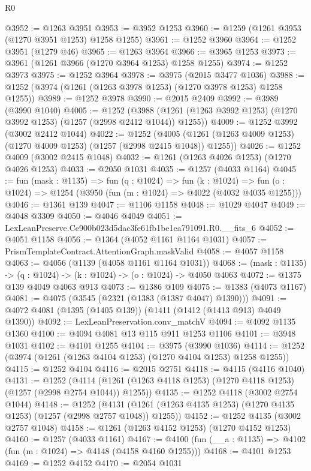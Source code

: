 \begin{lexlean}{R0}
\begin{coremodule}
@3952 := @1263 @3951
@3953 := @3952 @1253
@3960 := @1259 (@1261 @3953 (@1270 @3951 @1253) @1258 @1255)
@3961 := @1252 @3960
@3964 := @1252 @3951 (@1279 @46)
@3965 := @1263 @3964
@3966 := @3965 @1253
@3973 := @3961 (@1261 @3966 (@1270 @3964 @1253) @1258 @1255)
@3974 := @1252 @3973
@3975 := @1252 @3964
@3978 := @3975 (@2015 @3477 @1036)
@3988 := @1252 (@3974 (@1261 (@1263 @3978 @1253) (@1270 @3978 @1253) @1258 @1255))
@3989 := @1252 @3978
@3990 := @2015 @2409
@3992 := @3989 (@3990 @1040)
@4005 := @1252
    (@3988 (@1261 (@1263 @3992 @1253) (@1270 @3992 @1253) (@1257 (@2998 @2412 @1044)) @1255))
@4009 := @1252 @3992 (@3002 @2412 @1044)
@4022 := @1252
    (@4005 (@1261 (@1263 @4009 @1253) (@1270 @4009 @1253) (@1257 (@2998 @2415 @1048)) @1255))
@4026 := @1252 @4009 (@3002 @2415 @1048)
@4032 := @1261 (@1263 @4026 @1253) (@1270 @4026 @1253)
@4033 := @2050 @1031
@4035 := @1257 (@4033 @1164)
@4045 := fun (mask : @1135) =>
  fun (q : @1024) =>
  fun (k : @1024) => fun (o : @1024) => @1254 (@3950 (fun (m : @1024) => @4022 (@4032 @4035 @1255)))
@4046 := @1361 @139
@4047 := @1106 @1158
@4048 := @1029 @4047
@4049 := @4048 @3309
@4050 := @4046 @4049
@4051 := LexLeanPreserve.Ce900b023d5dac3fe61fb1be1ea791091.R0.__fits_6
@4052 := @4051 @1158
@4056 := @1364 (@4052 @1161 @1164 @1031)
@4057 := PrismTemplateContract.AttentionGraph.maskValid
@4058 := @4057 @1158
@4063 := @4056 (@1139 (@4058 @1161 @1164 @1031))
@4068 := (mask : @1135) -> (q : @1024) -> (k : @1024) -> (o : @1024) -> @4050 @4063
@4072 := @1375 @139 @4049 @4063 @913
@4073 := @1386 @109
@4075 := @1383 (@4073 @1167)
@4081 := @4075 (@3545 (@2321 (@1383 (@1387 @4047) @1390)))
@4091 := @4072 @4081 (@1395 (@1405 @139)) (@1411 (@1412 (@1413 @913) @4049 @1390))
@4092 := LexLeanPreservation.conv_matchV
@4094 := @4092 @1135 @1360
@4100 := @4094 @4081 @13 @115 @911 @1253 @1106
@4101 := @3948 @1031
@4102 := @4101 @1255
@4104 := @3975 (@3990 @1036)
@4114 := @1252 (@3974 (@1261 (@1263 @4104 @1253) (@1270 @4104 @1253) @1258 @1255))
@4115 := @1252 @4104
@4116 := @2015 @2751
@4118 := @4115 (@4116 @1040)
@4131 := @1252
    (@4114 (@1261 (@1263 @4118 @1253) (@1270 @4118 @1253) (@1257 (@2998 @2754 @1044)) @1255))
@4135 := @1252 @4118 (@3002 @2754 @1044)
@4148 := @1252
    (@4131 (@1261 (@1263 @4135 @1253) (@1270 @4135 @1253) (@1257 (@2998 @2757 @1048)) @1255))
@4152 := @1252 @4135 (@3002 @2757 @1048)
@4158 := @1261 (@1263 @4152 @1253) (@1270 @4152 @1253)
@4160 := @1257 (@4033 @1161)
@4167 := @4100 (fun (__a : @1135) => @4102 (fun (m : @1024) => @4148 (@4158 @4160 @1255)))
@4168 := @4101 @1253
@4169 := @1252 @4152
@4170 := @2054 @1031

\end{coremodule}
\end{lexlean}
